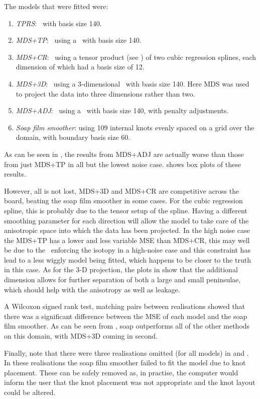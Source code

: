 The models that were fitted were:
\begin{enumerate}
\item \emph{TPRS}: \tprs\ with basis size 140.
\item \emph{MDS+TP}: \mdsap\ using a \tprs\ with basis size 140.
\item \emph{MDS+CR}: \mdsap\ using a tensor product (see ) of two cubic regression splines, each dimension of which had a basis size of 12.
\item \emph{MDS+3D}: \mdsap\ using a 3-dimensional \tprs\ with basis size 140. Here MDS was used to project the data into three dimensions rather than two.
\item \emph{MDS+ADJ}: \mdsap\ using a \tprs\ with basis size 140, with penalty adjustments.
\item \emph{Soap film smoother}: using 109 internal knots evenly spaced on a grid over the domain, with boundary basis size 60.
\end{enumerate}

As can be seen in , the results from MDS+ADJ are actually worse than those from just MDS+TP in all but the lowest noise case.  shows box plots of these results.

However, all is not lost, MDS+3D and MDS+CR are competitive across the board, beating the soap film smoother in some cases. For the cubic regression spline, this is probably due to the tensor setup of the spline. Having a different smoothing parameter for each direction will allow the model to take care of the anisotropic space into which the data has been projected. In the high noise case the MDS+TP has a lower and less variable MSE than MDS+CR, this may well be due to the \tprs\ enforcing the isotopy in a high-noise case and this constraint has lead to a less wiggly model being fitted, which happens to be closer to the truth in this case. As for the 3-D projection, the plots in  show that the additional dimension allows for further separation of both a large and small peninsulae, which should help with the anisotropy as well as leakage.

A Wilcoxon signed rank test, matching pairs between realisations showed that there was a significant difference between the MSE of each model and the soap film smoother. As can be seen from , soap outperforms all of the other methods on this domain, with MDS+3D coming in second. 

Finally, note that there were three realisations omitted (for all models) in  and . In these realisations the soap film smoother failed to fit the model due to knot placement. These can be safely removed as, in practise, the computer would inform the user that the knot placement was not appropriate and the knot layout could be altered.

